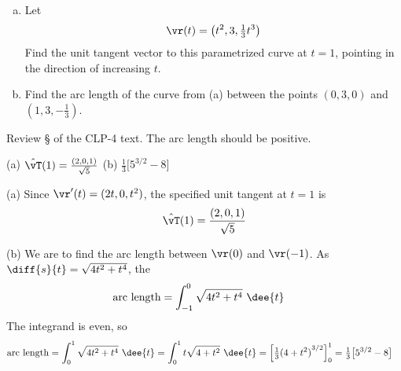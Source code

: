 \begin{question}[M317 2013D] %

\begin{enumerate}[(a)]
\item
Let
\begin{equation*}
\vr(t) = \left(t^2 , 3, \tfrac{1}{3} t^3 \right) 
\end{equation*}
Find the unit tangent vector to this parametrized curve at $t = 1$, 
pointing in the direction of increasing $t$.
\item
Find the arc length of the curve from (a) between the points $(0, 3, 0)$ 
and $(1, 3, -\frac{1}{3})$.

\end{enumerate}
\end{question}

\begin{hint} 
Review \S{} of the CLP-4 text.
The arc length should be positive.
\end{hint}

\begin{answer} 
(a) $\hat\vT(1) = \frac{(2,0,1)}{\sqrt{5}}$\qquad
(b) $\frac{1}{3}\big[5^{3/2}-8\big]$
\end{answer}

\begin{solution} (a)
Since $\vr'(t) = (2t,0,t^2)$, the specified unit tangent at $t=1$ is
\begin{equation*}
\hat\vT(1) = \frac{(2,0,1)}{\sqrt{5}}
\end{equation*}

\noindent (b)
We are to find the arc length between $\vr(0)$ and $\vr(-1)$. 
As $\diff{s}{t}=\sqrt{4t^2+t^4}$, the 
\begin{align*}
\text{arc length} &= \int_{-1}^0 \sqrt{4t^2+t^4}\ \dee{t}
\end{align*}
The integrand is even, so
\begin{align*}
\text{arc length} &= \int_0^1 \sqrt{4t^2+t^4}\ \dee{t}
=\int_0^1 t\sqrt{4+t^2}\ \dee{t}
=\Big[\tfrac{1}{3}{(4+t^2)}^{3/2}\Big]_0^1
=\tfrac{1}{3}\big[5^{3/2}-8\big]
\end{align*}

\end{solution}



